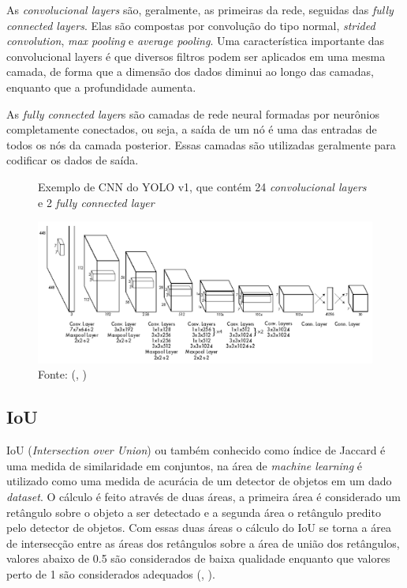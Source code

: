 \documentclass[]{politex}
\begin{document}
As \textit{convolucional layers} são, geralmente, as primeiras da rede, seguidas das \textit{fully connected layers}. Elas são compostas por convolução do tipo normal, \textit{strided convolution}, \textit{max pooling} e \textit{average pooling}. Uma característica importante das convolucional layers é que diversos filtros podem ser aplicados em uma mesma camada, de forma que a dimensão dos dados diminui ao longo das camadas, enquanto que a profundidade aumenta.

As \textit{fully connected layer}s são camadas de rede neural formadas por neurônios completamente conectados, ou seja, a saída de um nó é uma das entradas de todos os nós da camada posterior. Essas camadas são utilizadas geralmente para codificar os dados de saída.

\begin{figure}[H]
    \centering
    \caption{Exemplo de CNN do YOLO v1, que contém 24 \textit{convolucional layers} e 2 \textit{fully connected layer}}
    \includegraphics[width=\textwidth]{arquitetura_yolo}
    \caption*{Fonte: (, \citeyear{yolov1})}
    \label{fig:arq_yolo}
\end{figure}

\subsection{IoU}
IoU (\textit{Intersection over Union}) ou também conhecido como índice de Jaccard é uma medida de similaridade em conjuntos, na área de \textit{machine learning} é utilizado como uma medida de acurácia de um detector de objetos em um dado \textit{dataset}. O cálculo é feito através de duas áreas, a primeira área é considerado um retângulo sobre o objeto a ser detectado e a segunda área o retângulo predito pelo detector de objetos. Com essas duas áreas o cálculo do IoU se torna a área de intersecção entre as áreas dos retângulos sobre a área de união dos retângulos, valores abaixo de 0.5 são considerados de baixa qualidade enquanto que valores perto de 1 são considerados adequados (, \citeyear{iou}).
\end{document}
